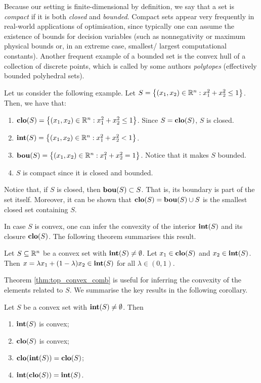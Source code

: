 Because our setting is finite-dimensional by definition, we say that a set is \emph{compact} if it is both \emph{closed} and \emph{bounded}. Compact sets appear very frequently in real-world applications of optimisation, since typically one can assume the existence of bounds for decision variables (such as nonnegativity or maximum physical bounds or, in an extreme case, smallest/ largest computational constants). Another frequent example of a bounded set is the convex hull of a collection of discrete points, which is called by some authors \emph{polytopes} (effectively bounded polyhedral sets).  

Let us consider the following example. Let $S = \left\{ (x_1,x_2) \in \mathbb{R}^n : x_1^2 + x_2^2 \leq 1 \right \}$. Then, we have that:
\begin{enumerate}
	\item $\mathop{\bf clo}(S) = \left\{ (x_1,x_2) \in \mathbb{R}^n : x_1^2 + x_2^2 \leq 1 \right \}$. Since $S = \mathop{\bf clo}(S)$, $S$ is closed.
	\item $\mathop{\bf int}(S) = \left\{ (x_1,x_2) \in \mathbb{R}^n : x_1^2 + x_2^2 < 1 \right \}$. 
	\item $\mathop{\bf bou}(S) = \left\{ (x_1,x_2) \in \mathbb{R}^n : x_1^2 + x_2^2 = 1 \right \}$. Notice that it makes $S$ bounded.
	\item $S$ is compact since it is closed and bounded. 
\end{enumerate}

Notice that, if $S$ is closed, then $\mathop{\bf bou}(S) \subset S$. That is, its boundary is part of the set itself. Moreover, it can be shown that $\mathop{\bf clo}(S) = \mathop{\bf bou}(S) \cup S$ is the smallest closed set containing $S$. 

In case $S$ is convex, one can infer the convexity of the interior $\mathop{\bf int}(S)$ and its closure $\mathop{\bf clo}(S)$. The following theorem summarises this result.
%
\begin{theorem}\label{thm:top_convex_comb}
Let $S \subseteq \mathbb{R}^n$ be a convex set with $\mathop{\bf int}(S) \neq \emptyset$. Let $x_1 \in \mathop{\bf clo}(S)$ and $x_2 \in \mathop{\bf int}(S)$. Then $x = \lambda x_1 + (1 - \lambda) x_2 \in \mathop{\bf int}(S)$ for all $\lambda \in (0,1)$.
\end{theorem}
%


Theorem \ref{thm:top_convex_comb} is useful for inferring the convexity of the elements related to $S$. We summarise the key results in the following corollary.
%
\begin{corollary} Let $S$ be a convex set with $\mathop{\bf int}(S) \neq \emptyset$. Then
	\begin{enumerate}
		\item $\mathop{\bf int}(S)$ is convex;
		\item $\mathop{\bf clo}(S)$ is convex;
		\item $\mathop{\bf clo}(\mathop{\bf int}(S)) = \mathop{\bf clo}(S)$;
		\item $\mathop{\bf int}(\mathop{\bf clo}(S)) = \mathop{\bf int}(S)$.
	\end{enumerate}
\end{corollary}
%

